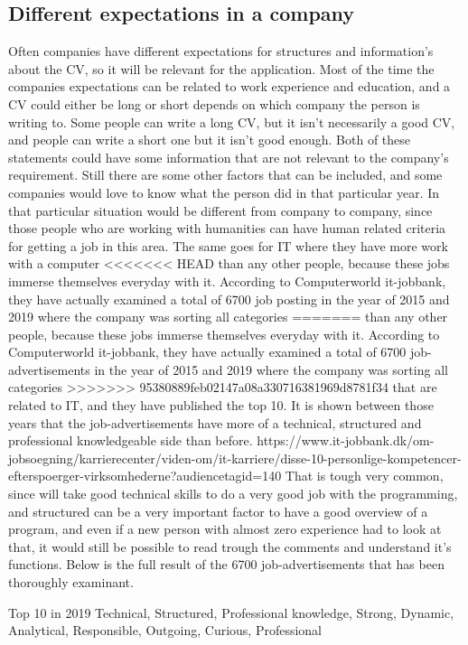 \subsection{Different expectations in a company}
Often companies have different expectations for structures and information's about the CV, so it will be relevant for the application.
Most of the time the companies expectations can be related to work experience and education,
and a CV could either be long or short depends on which company the person is writing to. Some people can write a long CV,
but it isn't necessarily a good CV, and people can write a short one but it isn't good enough.
Both of these statements could have some information that are not relevant to the company's requirement. Still there are some other
factors that can be included, and some companies would love to know what the person did in that particular year.
In that particular situation would be different from company to company, since those people who are working with humanities
can have human related criteria for getting a job in this area. The same goes for IT where they have more work with a computer
<<<<<<< HEAD
than any other people, because these jobs immerse themselves everyday with it. According to Computerworld it-jobbank, 
they have actually examined a total of 6700 job posting in the year of 2015 and 2019 where the company was sorting all categories
=======
than any other people, because these jobs immerse themselves everyday with it. According to Computerworld it-jobbank,
they have actually examined a total of 6700 job-advertisements in the year of 2015 and 2019 where the company was sorting all categories
>>>>>>> 95380889feb02147a08a330716381969d8781f34
that are related to IT, and they have published the top 10. It is shown between those years that the job-advertisements
have more of a technical, structured and professional knowledgeable side than before.
https://www.it-jobbank.dk/om-jobsoegning/karrierecenter/viden-om/it-karriere/disse-10-personlige-kompetencer-efterspoerger-virksomhederne?audiencetagid=140
That is tough very common, since will take good technical skills to do a very good job with the programming,
and structured can be a very important factor to have a good overview of a program,
and even if a new person with almost zero experience had to look at that,
it would still be possible to read trough the comments and understand it's functions. Below is the full result
of the 6700 job-advertisements that has been thoroughly examinant.

Top 10 in 2019
Technical,
Structured,
Professional knowledge,
Strong,
Dynamic,
Analytical,
Responsible,
Outgoing,
Curious,
Professional \\

